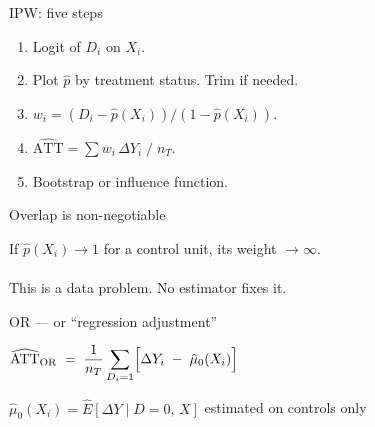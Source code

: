 \documentclass[aspectratio=169,11pt]{beamer}
\begin{document}
\begin{frame}{IPW: five steps}
\vspace{0.8em}
\begin{enumerate}\setlength\itemsep{0.5em}
  \item {} \;Logit of $D_i$ on $X_i$.
  \item {} \;Plot $\hat{p}$ by treatment status. Trim if needed.
  \item {} \;$w_i = (D_i - \hat{p}(X_i)) / (1 - \hat{p}(X_i))$.
  \item {} \;$\widehat{\mathrm{ATT}} = \sum w_i\,\Delta Y_i \;/\; n_T$.
  \item {} \;Bootstrap or influence function.
\end{enumerate}
\end{frame}

\begin{frame}{Overlap is non-negotiable}
\vspace{1.2em}
\begin{center}
\large
If $\hat{p}(X_i) \to 1$ for a control unit, its weight $\to \infty$.\\[0.8em]
\\[0.8em]
\color{warmgray}\normalsize
This is a data problem. No estimator fixes it.
\end{center}
\end{frame}


\begin{frame}{OR --- or ``regression adjustment''}
\vspace{0.6em}
\begin{center}
\large
$\widehat{\mathrm{ATT}}_{\mathrm{OR}}
  \;=\; \dfrac{1}{n_T}
        \displaystyle\sum_{D_i=1}
        \Bigl[\Delta Y_i \;-\; \hat\mu_0(X_i)\Bigr]$
\end{center}
\vspace{0.6em}
\begin{center}
\color{warmgray}\small
$\hat\mu_0(X_i) = \widehat{E}[\Delta Y \mid D{=}0,\,X]$ \quad estimated on controls only
\end{center}
\end{frame}
\end{document}
